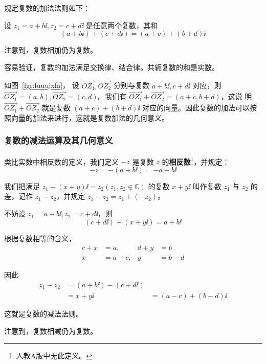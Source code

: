 \documentclass[a4paper,openany]{ctexbook}
\renewcommand{\vec}{\overrightarrow}
\begin{document}
规定复数的加法法则如下：

设 \(z_1=a+b \ii,z_2=c+d \ii\) 是任意两个复数，其和
\[
    (a+b \ii)+(c+d \ii)=(a+c)+(b+d) \ii
\]

注意到，复数相加仍为复数。

容易验证，复数的加法满足交换律、结合律。共轭复数的和是实数。

如图~\ref{fgr:fuuujxfa}，%
设 \(\vec{OZ_1},\vec{OZ_2}\) 分别与复数 \(a+b\ii,c+d\ii\) 对应，则 \(\vec{OZ_1}=(a,b),\vec{OZ_2}=(c,d)\)。我们有 \(\vec{OZ_1}+\vec{OZ_2}=(a+c,b+d)\)，这说
明 \(\vec{OZ_1}+\vec{OZ_2}\) 就是复数 \((a+c)+(b+d) \ii\) 对应的向量。因此复数的加法可以按照向量的加法来进行，这就是复数加法的几何意义。

\subsubsection{复数的减法运算及其几何意义}

类比实数中相反数的定义，我们定义 \(-z\) 是复数 \(z\) 的\textbf{相反数}\footnote{人教A版中无此定义。}，并规定：
\[
    -z=-(a+b\ii)=-a-b\ii
\]

我们把满足 \(z_1+(x+y)\ii=z_2(z_1,z_2 \in \mathbb{C})\) 的复数 \(x+y\ii\) 叫作复数 \(z_1\) 与 \(z_2\) 的差，记作 \(z_1-z_2\)，并规定 \(z_1-z_2=z_1+(-z_2)\)。

不妨设 \(z_1=a+b\ii,z_2=c+d\ii\)，则\[(c+d\ii)+(x+y\ii)=a+b\ii\]

根据复数相等的含义，
\begin{align*}
    c+x & = a,  & d+y & =b   \\
    x   & =a-c, & y   & =b-d
\end{align*}

因此
\begin{align*}
    z_1-z_2 & =(a+b\ii)-(c+d\ii) \\
            & =x+y\ii
            & =(a-c)+(b-d)\ii
\end{align*}

这就是复数的减法法则。

注意到，复数相减仍为复数。
\end{document}
